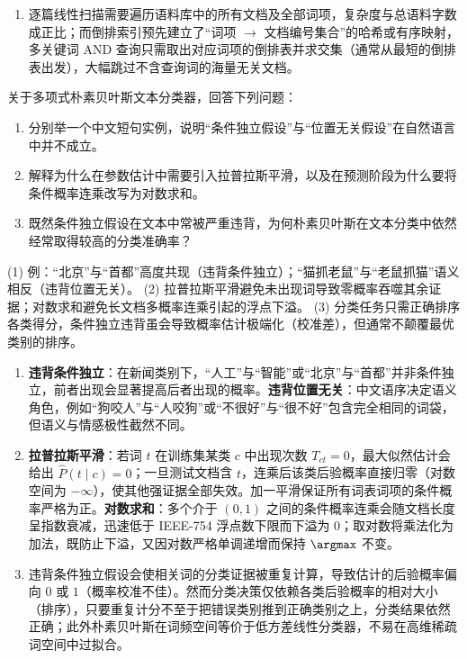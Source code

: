 \begin{exercise}[title={中文分词歧义辨析与倒排索引原理},level=basic,points=10,tags={中文分词,切分歧义,倒排索引}]
\begin{solution}
\begin{enumerate}
  \item 逐篇线性扫描需要遍历语料库中的所有文档及全部词项，复杂度与总语料字数成正比；而倒排索引预先建立了“词项 $\to$ 文档编号集合”的哈希或有序映射，多关键词 AND 查询只需取出对应词项的倒排表并求交集（通常从最短的倒排表出发），大幅跳过不含查询词的海量无关文档。
\end{enumerate}
\end{solution}
\end{exercise}

\begin{exercise}[title={朴素贝叶斯独立性假设、平滑与对数技巧},level=basic,points=10,tags={朴素贝叶斯,拉普拉斯平滑,词袋假设}]\label{ex:ch07-nb-concepts}
关于多项式朴素贝叶斯文本分类器，回答下列问题：
\begin{enumerate}
  \item 分别举一个中文短句实例，说明“条件独立假设”与“位置无关假设”在自然语言中并不成立。
  \item 解释为什么在参数估计中需要引入拉普拉斯平滑，以及在预测阶段为什么要将条件概率连乘改写为对数求和。
  \item 既然条件独立假设在文本中常被严重违背，为何朴素贝叶斯在文本分类中依然经常取得较高的分类准确率？
\end{enumerate}
\begin{answer}
(1) 例：“北京”与“首都”高度共现（违背条件独立）；“猫抓老鼠”与“老鼠抓猫”语义相反（违背位置无关）。
(2) 拉普拉斯平滑避免未出现词导致零概率吞噬其余证据；对数求和避免长文档多概率连乘引起的浮点下溢。
(3) 分类任务只需正确排序各类得分，条件独立违背虽会导致概率估计极端化（校准差），但通常不颠覆最优类别的排序。
\end{answer}
\begin{solution}
\begin{enumerate}
  \item \textbf{违背条件独立}：在新闻类别下，“人工”与“智能”或“北京”与“首都”并非条件独立，前者出现会显著提高后者出现的概率。\textbf{违背位置无关}：中文语序决定语义角色，例如“狗咬人”与“人咬狗”或“不很好”与“很不好”包含完全相同的词袋，但语义与情感极性截然不同。
  \item \textbf{拉普拉斯平滑}：若词 $t$ 在训练集某类 $c$ 中出现次数 $T_{ct}=0$，最大似然估计会给出 $\hat{P}(t\mid c)=0$；一旦测试文档含 $t$，连乘后该类后验概率直接归零（对数空间为 $-\infty$），使其他强证据全部失效。加一平滑保证所有词表词项的条件概率严格为正。\textbf{对数求和}：多个介于 $(0,1)$ 之间的条件概率连乘会随文档长度呈指数衰减，迅速低于 IEEE-754 浮点数下限而下溢为 $0$；取对数将乘法化为加法，既防止下溢，又因对数严格单调递增而保持 $\argmax$ 不变。
  \item 违背条件独立假设会使相关词的分类证据被重复计算，导致估计的后验概率偏向 $0$ 或 $1$（概率校准不佳）。然而分类决策仅依赖各类后验概率的相对大小（排序），只要重复计分不至于把错误类别推到正确类别之上，分类结果依然正确；此外朴素贝叶斯在词频空间等价于低方差线性分类器，不易在高维稀疏词空间中过拟合。
\end{enumerate}
\end{solution}
\end{exercise}

